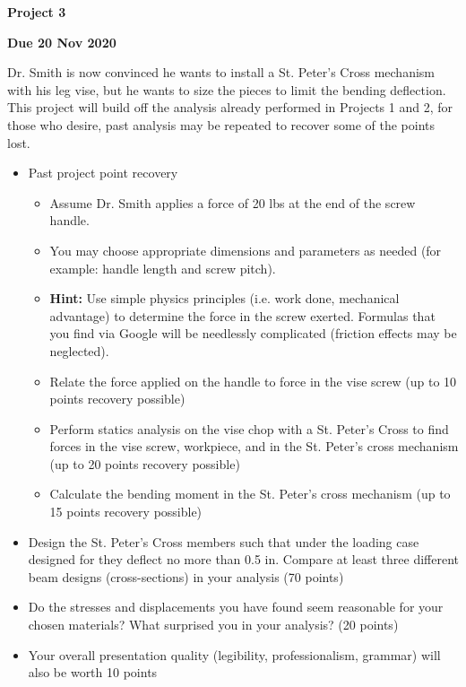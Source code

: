 \documentclass[12pt, oneside]{article}
\begin{document}
\begin{center}
\textbf{\Large Project 3}

\textbf{Due 20 Nov 2020}
\end{center}

Dr. Smith is now convinced he wants to install a St. Peter's Cross mechanism with his leg vise, but he wants to size the pieces to limit the bending deflection.
This project will build off the analysis already performed in Projects 1 and 2, for those who desire, past analysis may be repeated to recover some of the points lost.
\begin{itemize}
	\item Past project point recovery
		\begin{itemize}
			\item Assume Dr. Smith applies a force of 20 lbs at the end of the screw handle.
			\item You may choose appropriate dimensions and parameters as needed (for example: handle length and screw pitch). 
			\item \textbf{Hint:} Use simple physics principles (i.e. work done, mechanical advantage) to determine the force in the screw exerted. Formulas that you find via Google will be needlessly complicated (friction effects may be neglected).
			\item Relate the force applied on the handle to force in the vise screw (up to 10 points recovery possible) 
			\item Perform statics analysis on the vise chop with a St. Peter's Cross to find forces in the vise screw, workpiece, and in the St. Peter's cross mechanism (up to 20 points recovery possible)
			\item Calculate the bending moment in the St. Peter's cross mechanism (up to 15 points recovery possible)
		\end{itemize}
	\item Design the St. Peter's Cross members such that under the loading case designed for they deflect no more than 0.5 in.
		Compare at least three different beam designs (cross-sections) in your analysis (70 points)
	\item Do the stresses and displacements you have found seem reasonable for your chosen materials? What surprised you in your analysis? (20 points)
	\item Your overall presentation quality (legibility, professionalism, grammar) will also be worth 10 points
\end{itemize}
\end{document}
